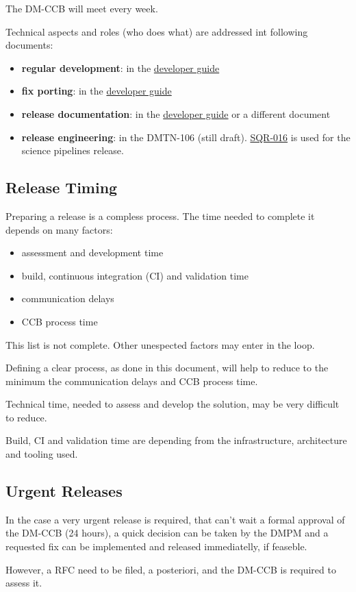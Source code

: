 The DM-CCB will meet every week.

Technical aspects and roles (who does what) are addressed int following documents:

\begin{itemize}
\item {\bf regular development}: in the \href{https://developer.lsst.io/}{developer guide}
\item {\bf fix porting}: in the \href{https://developer.lsst.io/}{developer guide}
\item {\bf release documentation}: in the \href{https://developer.lsst.io/}{developer guide} or a different document
\item {\bf release engineering}: in the DMTN-106 (still draft). \href{https://sqr-016.lsst.io/}{SQR-016} is used for the science pipelines release.
\end{itemize}


\subsection{Release Timing}

Preparing a release is a compless process.
The time needed to complete it depends on many factors:

\begin{itemize}
\item assessment and development time
\item build, continuous integration (CI) and validation time
\item communication delays
\item CCB process time
\end{itemize}

This list is not complete. Other unespected factors may enter in the loop.

Defining a clear process, as done in this document, will help to reduce to the minimum the communication delays and CCB process time.

Technical time, needed to assess and develop the solution, may be very difficult to reduce.

Build, CI and validation time are depending from the infrastructure, architecture and tooling used. 


\subsection{Urgent Releases}

In the case a very urgent release is required, that can't wait a formal approval of the DM-CCB (24 hours), 
a quick decision can be taken by the DMPM and a requested fix can be implemented and released immediatelly, if feaseble.

However, a RFC need to be filed, a posteriori, and the DM-CCB is required to assess it.

